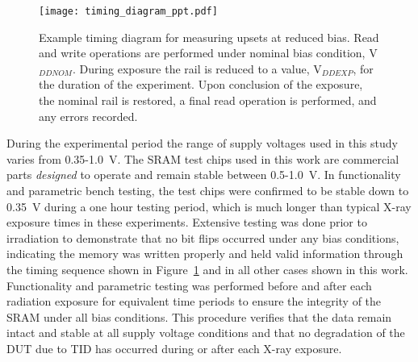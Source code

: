 \begin{figure}[htb]
    \centering
        \texttt{[image: timing\_diagram\_ppt.pdf]}
        \caption{Example timing diagram for measuring upsets at reduced bias. Read and write operations are performed under nominal bias condition, V$_{DDNOM}$. During exposure the rail is reduced to a value, V$_{DDEXP}$, for the duration of the experiment. Upon conclusion of the exposure, the nominal rail is restored, a final read operation is performed, and any errors recorded.}
        \label{fig:exp_timing_diagram}
\end{figure}

During the experimental period the range of supply voltages used in this study varies from 0.35-1.0~V. 
The SRAM test chips used in this work are commercial parts \emph{designed} to operate and remain stable between 0.5-1.0~V.
In functionality and parametric bench testing, the test chips were confirmed to be stable down to 0.35~V during a one hour testing period, which is much longer than typical X-ray exposure times in these experiments.
Extensive testing was done prior to irradiation to demonstrate that no bit flips occurred under any bias conditions, indicating the memory was written properly and held valid information through the timing sequence shown in Figure~\ref{fig:exp_timing_diagram} and in all other cases shown in this work. 
Functionality and parametric testing was performed before and after each radiation exposure for equivalent time periods to ensure the integrity of the SRAM under all bias conditions. 
This procedure verifies that the data remain intact and stable at all supply voltage conditions and that no degradation of the DUT due to TID has occurred during or after each X-ray exposure.

